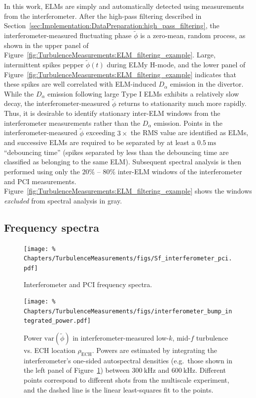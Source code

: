 In this work, ELMs are simply and automatically detected
using measurements from the interferometer.
After the high-pass filtering described in
Section~\ref{sec:Implementation:DataPreparation:high_pass_filtering},
the interferometer-measured fluctuating phase $\tilde{\phi}$
is a zero-mean, random process,
as shown in the upper panel of
Figure~\ref{fig:TurbulenceMeasurements:ELM_filtering_example}.
Large, intermittent spikes pepper $\tilde{\phi}(t)$ during ELMy H-mode, and
the lower panel of
Figure~\ref{fig:TurbulenceMeasurements:ELM_filtering_example}
indicates that these spikes are well correlated
with ELM-induced $D_{\alpha}$ emission in the divertor.
While the $D_{\alpha}$ emission following large Type I ELMs
exhibits a relatively slow decay,
the interferometer-measured $\tilde{\phi}$
returns to stationarity much more rapidly.
Thus, it is desirable to identify
stationary inter-ELM windows
from the interferometer measurements
rather than the $D_{\alpha}$ emission.
Points in the interferometer-measured $\tilde{\phi}$
exceeding $3 \times$ the RMS value
are identified as ELMs, and
successive ELMs are required to be separated
by at least a $\SI{0.5}{\milli\second}$ ``debouncing time''
(spikes separated by less than the debouncing time
are classified as belonging to the same ELM).
Subsequent spectral analysis is then performed
using only the $20\%$ -- $80\%$ inter-ELM windows
of the interferometer and PCI measurements.
Figure~\ref{fig:TurbulenceMeasurements:ELM_filtering_example}
shows the windows \emph{excluded} from spectral analysis in gray.


\subsection{Frequency spectra}
\label{sec:TurbulenceMeasurements:Sf}
\begin{figure}
  \centering
  \texttt{[image: \%
    Chapters/TurbulenceMeasurements/figs/Sf\_interferometer\_pci.pdf]}
  \caption[Interferometer \& PCI frequency spectra]{%
    Interferometer and PCI frequency spectra.
  }
\label{fig:TurbulenceMeasurements:Sf_interferometer_pci}
\end{figure}

\begin{figure}
  \centering
  \texttt{[image: \%
    Chapters/TurbulenceMeasurements/figs/interferometer\_bump\_integrated\_power.pdf]}
  \caption[Power in low-$k$, mid-$f$ turbulence vs. ECH location]{%
    Power $\text{var}(\tilde{\phi})$ in interferometer-measured
    low-$k$, mid-$f$ turbulence vs. ECH location $\rho_{\text{ECH}}$.
    Powers are estimated by integrating the interferometer's
    one-sided autospectral densities
    (e.g.\ those shown in the left panel of
    Figure~\ref{fig:TurbulenceMeasurements:Sf_interferometer_pci})
    between $\SI{300}{\kilo\hertz}$ and $\SI{600}{\kilo\hertz}$.
    Different points correspond to different shots
    from the multiscale experiment, and
    the dashed line is the linear least-squares fit to the points.
  }
\label{fig:TurbulenceMeasurements:interferometer_bump_integrated_power}
\end{figure}

